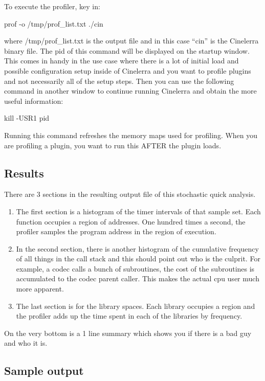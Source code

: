 To execute the profiler, key in: 
\medskip

\hspace{2em}prof -o /tmp/prof\_list.txt ./cin
\medskip

where /tmp/prof\_list.txt is the output file and in this case ``cin'' is the Cinelerra binary file. The pid of this command will be displayed on the startup window. This comes in handy in the use case where there is a lot of initial load and possible configuration setup inside of Cinelerra and you want to profile plugins and not necessarily all of the setup steps. Then you can use the following command in another window to continue running Cinelerra and obtain the more useful information:
\medskip

\hspace{2em}kill -USR1 pid
\medskip

Running this command refreshes the memory maps used for profiling. When you are profiling a plugin, you want to run this AFTER the plugin loads.
\medskip

\subsection{Results}

There are 3 sections in the resulting output file of this stochastic quick analysis.
\medskip

\begin{enumerate}[nosep]
	\item The first section is a histogram of the timer intervals of that sample set. Each function occupies a region of addresses. One hundred times a second, the profiler samples the program address in the region of execution.
	\item In the second section, there is another histogram of the cumulative frequency of all things in the call stack and this should point out who is the culprit. For example, a codec calls a bunch of subroutines, the cost of the subroutines is accumulated to the codec parent caller. This makes the actual cpu user much more apparent.
	\item The last section is for the library spaces. Each library occupies a region and the profiler adds up the time spent in each of the libraries by frequency.
\end{enumerate}
\smallskip

On the very bottom is a 1 line summary which shows you if there is a bad guy and who it is.
\medskip

\subsection{Sample output}

